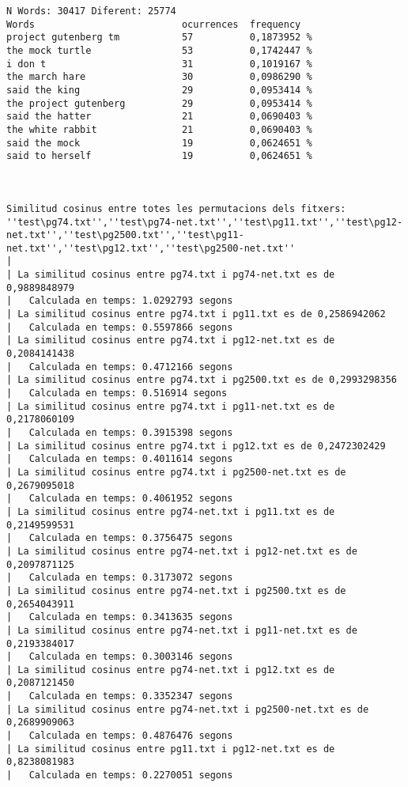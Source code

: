 \documentclass{report}
\begin{document}
\newpage

\begin{verbatim}
N Words: 30417 Diferent: 25774
Words                          ocurrences  frequency
project gutenberg tm           57          0,1873952 %
the mock turtle                53          0,1742447 %
i don t                        31          0,1019167 %
the march hare                 30          0,0986290 %
said the king                  29          0,0953414 %
the project gutenberg          29          0,0953414 %
said the hatter                21          0,0690403 %
the white rabbit               21          0,0690403 %
said the mock                  19          0,0624651 %
said to herself                19          0,0624651 %



Similitud cosinus entre totes les permutacions dels fitxers:
''test\pg74.txt'',''test\pg74-net.txt'',''test\pg11.txt'',''test\pg12-net.txt'',''test\pg2500.txt'',''test\pg11-net.txt'',''test\pg12.txt'',''test\pg2500-net.txt''
|
| La similitud cosinus entre pg74.txt i pg74-net.txt es de 0,9889848979
|	Calculada en temps: 1.0292793 segons
| La similitud cosinus entre pg74.txt i pg11.txt es de 0,2586942062
|	Calculada en temps: 0.5597866 segons
| La similitud cosinus entre pg74.txt i pg12-net.txt es de 0,2084141438
|	Calculada en temps: 0.4712166 segons
| La similitud cosinus entre pg74.txt i pg2500.txt es de 0,2993298356
|	Calculada en temps: 0.516914 segons
| La similitud cosinus entre pg74.txt i pg11-net.txt es de 0,2178060109
|	Calculada en temps: 0.3915398 segons
| La similitud cosinus entre pg74.txt i pg12.txt es de 0,2472302429
|	Calculada en temps: 0.4011614 segons
| La similitud cosinus entre pg74.txt i pg2500-net.txt es de 0,2679095018
|	Calculada en temps: 0.4061952 segons
| La similitud cosinus entre pg74-net.txt i pg11.txt es de 0,2149599531
|	Calculada en temps: 0.3756475 segons
| La similitud cosinus entre pg74-net.txt i pg12-net.txt es de 0,2097871125
|	Calculada en temps: 0.3173072 segons
| La similitud cosinus entre pg74-net.txt i pg2500.txt es de 0,2654043911
|	Calculada en temps: 0.3413635 segons
| La similitud cosinus entre pg74-net.txt i pg11-net.txt es de 0,2193384017
|	Calculada en temps: 0.3003146 segons
| La similitud cosinus entre pg74-net.txt i pg12.txt es de 0,2087121450
|	Calculada en temps: 0.3352347 segons
| La similitud cosinus entre pg74-net.txt i pg2500-net.txt es de 0,2689909063
|	Calculada en temps: 0.4876476 segons
| La similitud cosinus entre pg11.txt i pg12-net.txt es de 0,8238081983
|	Calculada en temps: 0.2270051 segons

\end{verbatim}
\end{document}
